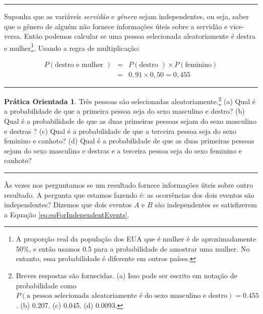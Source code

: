 \documentclass[
]{book}
\theoremstyle{definition}
\theoremstyle{definition}
\theoremstyle{definition}
\newtheorem{exercise}{Prática Orientada}[chapter]
\theoremstyle{definition}
\theoremstyle{remark}
\begin{document}
\begin{center}\rule{0.5\linewidth}{0.5pt}\end{center}

Suponha que as variáveis \emph{servidão} e \emph{gênero} sejam independentes, ou seja, saber que o gênero de alguém não fornece informações úteis sobre a servidão e vice-versa. Então podemos calcular se uma pessoa selecionada aleatoriamente é destra e mulher\footnote{A proporção real da população dos EUA que é mulher é de aproximadamente 50\%, e então usamos 0.5 para a probabilidade de amostrar uma mulher. No entanto, essa probabilidade é diferente em outros países.}. Usando a regra de multiplicação:

\begin{eqnarray*}
P(\text{destro e mulher }) &=& P(\text{destro }) \times  P(\text{feminino}) \\
&=& 0,91 \times  0,50 = 0,455
\end{eqnarray*}

\begin{center}\rule{0.5\linewidth}{0.5pt}\end{center}

\begin{exercise}
\protect\hypertarget{exr:unnamed-chunk-55}{}{\label{exr:unnamed-chunk-55} }
Três pessoas são selecionadas aleatoriamente.\footnote{Breves respostas são fornecidas. (a) Isso pode ser escrito em notação de probabilidade como \(P(\text{a pessoa selecionada aleatoriamente é do sexo masculino e destro}) = 0.455\). (b) 0.207. (c) 0.045. (d) 0.0093.}
(a) Qual é a probabilidade de que a primeira pessoa seja do sexo masculino e destro?
(b) Qual é a probabilidade de que as duas primeiras pessoas sejam do sexo masculino e destras ?
(c) Qual é a probabilidade de que a terceira pessoa seja do sexo feminino e canhoto?
(d) Qual é a probabilidade de que as duas primeiras pessoas sejam do sexo masculino e destras e a terceira pessoa seja do sexo feminino e canhoto?
\end{exercise}

\begin{center}\rule{0.5\linewidth}{0.5pt}\end{center}

Às vezes nos perguntamos se um resultado fornece informações úteis sobre outro resultado. A pergunta que estamos fazendo é: as ocorrências dos dois eventos são independentes? Dizemos que dois eventos \(A\) e \(B\) são independentes se satisfizerem a Equação \eqref{eq:eqForIndependentEvents}.
\end{document}
